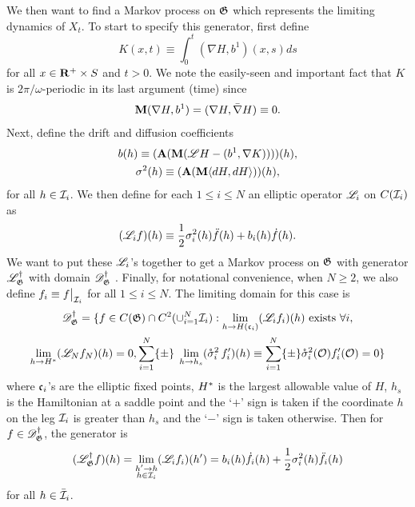We then want to find a Markov process on $\mathfrak G$ which represents the limiting dynamics of $X_t$. To start to specify this generator, first define
\[
K(x,t) \equiv \int_0^t (\nabla H, b^1)(x,s) ds
\]
for all $x \in \mathbf R^+\times S$ and $t>0$. We note the easily-seen and important fact that $K$ is $2\pi/ \omega$-periodic in its last argument (time) since
\[
\operatorname{\mathbf M} (\nabla H,b^1) = (\nabla H, \bar \nabla H) \equiv 0.
\]
Next, define the drift and diffusion coefficients
\begin{gather}
b(h) \equiv (\operatorname{\mathbf A} (\operatorname{\mathbf M} (\mathscr L H - (b^1,\nabla K))))(h)\label{e:oscillator drift},\\
\sigma^2(h) \equiv (\operatorname{\mathbf A} (\operatorname{\mathbf M} \langle dH,dH\rangle))(h)\label{e:oscillator diffusion},
\end{gather}
for all $h\in \mathcal I_i$.  We then define for each $1 \le i \le N$ an elliptic operator $\mathscr L_i$ on $C(\mathcal I_i)$ as
\[
(\mathscr L_i f)(h) \equiv \frac12 \sigma^2_i(h) \ddot f(h) + b_i(h)\dot f(h).
\]
We want to put these $\mathscr L_i$'s together to get a Markov process on $\mathfrak G$ with generator $\mathscr L^\dagger_\mathfrak G$ with domain $\mathscr D^\dagger_\mathfrak G$ . Finally, for notational convenience, when $N\ge 2$, we also define $f_i\equiv f\big|_{\mathcal I_i}$ for all $1\le i\le N$. The limiting domain for this case is
\begin{multline*}
\mathscr D_\mathfrak G^\dagger = \{f \in C(\mathfrak G) \cap C^2(\cup_{i=1}^N \mathcal I_i): \lim_{h \to H(\mathfrak c_i)}(\mathscr L_i f_i)(h) \text{ exists } \forall i,\\
\lim_{h \to H^*}(\mathscr L_N f_N)(h) = 0, \sum_{i=1}^N \{\pm\} \; \lim_{h \to h_s}(\mathring{\sigma}_{i}^2\,f^{\prime}_{i})(h) \equiv \sum_{i=1}^N \{\pm\} \mathring{\sigma}_i^2({\mathcal O})f^{\prime}_{i}({\mathcal O}) = 0\}
\end{multline*}
where $\mathfrak c_i$'s are the elliptic fixed points, $H^*$ is the largest allowable value of $H$, $h_s$ is the Hamiltonian at a saddle point and the `$+$' sign is taken if the coordinate $h$ on the leg $\mathcal I_i$ is greater than $h_s$ and the `$-$' sign is taken otherwise. Then for $f\in \mathscr D_\mathfrak G^\dagger$, the generator is
\[
(\mathscr L^\dagger_\mathfrak G f)(h) = \lim_{\substack{h'\to h\\
h\in \mathcal I_i}}(\mathscr L_i f_i)(h') = b_i(h)\dot f_i (h) + \frac12 \sigma^2_i(h)\ddot f_i(h)
\]
for all $h\in \bar {\mathcal I}_i$.

